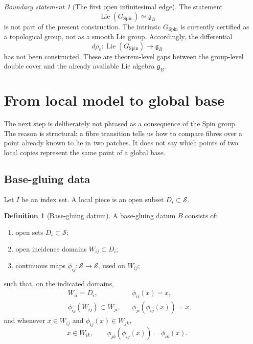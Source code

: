 \documentclass[11pt,a4paper]{article}
\theoremstyle{definition}
\newtheorem{definition}[theorem]{Definition}
\theoremstyle{remark}
\newtheorem{boundary}[theorem]{Boundary statement}
\newcommand{\Smodel}{\mathcal{S}}
\newcommand{\SpinG}{G_{\mathrm{Spin}}}
\newcommand{\gB}{\mathfrak{g}_{B}}
\begin{document}
\begin{boundary}[The first open infinitesimal edge]
\label{bdry:lie-spin}
The statement
\[
   \operatorname{Lie}(\SpinG)\simeq\gB
\tag{4.7}
\]
is not part of the present construction.  The intrinsic \(\SpinG\) is
currently certified as a topological group, not as a smooth Lie group.
Accordingly, the differential
\[
   d\rho_{e}:\operatorname{Lie}(\SpinG)
   \longrightarrow\gB
\tag{4.8}
\]
has not been constructed.  These are theorem-level gaps between the
group-level double cover and the already available Lie algebra \(\gB\).
\end{boundary}

\clearpage
\section{From local model to global base}
\label{sec:globalization}

The next step is deliberately not phrased as a consequence of the Spin
group.  The reason is structural: a fibre transition tells us how to
compare fibres over a point already known to lie in two patches.  It does
not say which points of two local copies represent the same point of a
global base.

\subsection{Base-gluing data}

Let \(I\) be an index set.  A local piece is an open subset
\(D_i\subset\Smodel\).

\begin{definition}[Base-gluing datum]
\label{def:basegluing}
A base-gluing datum \(B\) consists of:
\begin{enumerate}
\item open sets \(D_i\subset\Smodel\);
\item open incidence domains \(W_{ij}\subset D_i\);
\item continuous maps
      \(\phi_{ij}:\Smodel\to\Smodel\), used on \(W_{ij}\);
\end{enumerate}
such that, on the indicated domains,
\[
\begin{aligned}
   &W_{ii}=D_i,
   &&\phi_{ii}(x)=x,\\
   &\phi_{ij}(W_{ij})\subset W_{ji},
   &&\phi_{ji}(\phi_{ij}(x))=x,
\end{aligned}
\tag{5.1}
\]
and whenever \(x\in W_{ij}\) and
\(\phi_{ij}(x)\in W_{jk}\),
\[
   x\in W_{ik},
   \qquad
   \phi_{jk}(\phi_{ij}(x))=\phi_{ik}(x).
\tag{5.2}
\]
\end{definition}
\end{document}
